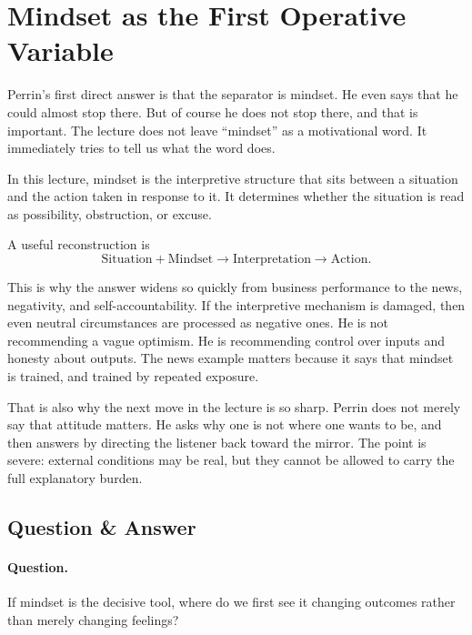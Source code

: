 \section{Mindset as the First Operative Variable}

Perrin's first direct answer is that the separator is mindset. He even says that he could almost stop there. But of course he does not stop there, and that is important. The lecture does not leave ``mindset'' as a motivational word. It immediately tries to tell us what the word does.

\begin{definition}
In this lecture, mindset is the interpretive structure that sits between a situation and the action taken in response to it. It determines whether the situation is read as possibility, obstruction, or excuse.
\end{definition}

A useful reconstruction is
\begin{equation}
\text{Situation} + \text{Mindset} \to \text{Interpretation} \to \text{Action}.
\end{equation}

This is why the answer widens so quickly from business performance to the news, negativity, and self-accountability. If the interpretive mechanism is damaged, then even neutral circumstances are processed as negative ones. He is not recommending a vague optimism. He is recommending control over inputs and honesty about outputs. The news example matters because it says that mindset is trained, and trained by repeated exposure.

That is also why the next move in the lecture is so sharp. Perrin does not merely say that attitude matters. He asks why one is not where one wants to be, and then answers by directing the listener back toward the mirror. The point is severe: external conditions may be real, but they cannot be allowed to carry the full explanatory burden.

\subsection{Question \& Answer}

\paragraph{Question.} If mindset is the decisive tool, where do we first see it changing outcomes rather than merely changing feelings?

